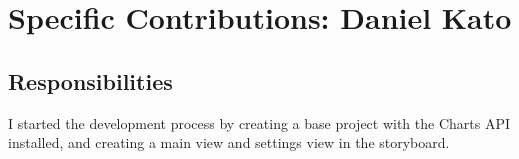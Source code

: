 \documentclass[onecolumn, draftclsnofoot,10pt, compsoc]{IEEEtran}
\begin{document}
%



%
\section{Specific Contributions: Daniel Kato}
    \subsection{Responsibilities}
    I started the development process by creating a base project with the Charts API installed, and creating a main view and settings view in the storyboard.
\end{document}
